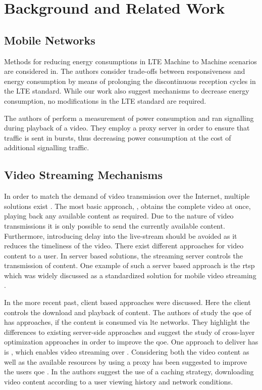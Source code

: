 \section{Background and Related Work}\label{sec:application:background}

\subsection{Mobile Networks}

Methods for reducing energy consumptions in \gls{LTE} Machine to Machine scenarios are considered in.
The authors consider trade-offs between responsiveness and energy consumption by means of prolonging the discontinuous reception cycles in the \gls{LTE} standard.
While our work also suggest mechanisms to decrease energy consumption, no modifications in the \gls{LTE} standard are required.

The authors of \citep{siekkinen2013} perform a measurement of power consumption and \gls{ran} signalling during playback of a \youtube video.
They employ a proxy server in order to ensure that traffic is sent in bursts, thus decreasing power consumption at the cost of additional signalling traffic.

\subsection{Video Streaming Mechanisms}\label{sec:application:background:video_streaming_mechanisms}

In order to match the demand of video transmission over the Internet, multiple solutions exist \citep{begen2011}.
The most basic approach, \download, obtains the complete video at once, playing back any available content as required.
Due to the nature of \live video transmissions it is only possible to send the currently available content.
Furthermore, introducing delay into the live-stream should be avoided as it reduces the timeliness of the video.
There exist different approaches for \streaming video content to a user.
In server based solutions, the streaming server controls the transmission of content.
One example of such a server based approach is the \gls{rtsp} which was widely discussed as a standardized solution for mobile video streaming \citep{elsen2001}.

In the more recent past, client based approaches were discussed.
Here the client controls the download and playback of content.
The authors of \citep{oyman2012} study the \gls{qoe} of \gls{has} approaches, if the content is consumed via \gls{lte} networks.
They highlight the differences to existing server-side approaches and suggest the study of cross-layer optimization approaches in order to improve the \gls{qoe}.
One approach to deliver \gls{has} is \dash, which enables video streaming over \http \citep{sodagar2011}.
Considering both the video content as well as the available resources by using a proxy has been suggested to improve the users \gls{qoe} \citep{essaili2013}.
In \citep{xin2012} the authors suggest the use of a caching strategy, downloading video content according to a user viewing history and network conditions.

